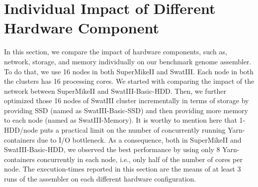 \documentclass[conference]{IEEEtran}
\begin{document}
\section {Individual Impact of Different Hardware Component} \label{IndividualImpactofDifferentHardwareConfiguration}
In this section, we compare the impact of hardware components, such as, network, storage, and memory individually on our benchmark genome assembler. To do that, we use 16 nodes in both SuperMikeII and SwatIII. Each node in both the clusters has 16 processing cores. We started with comparing the impact of the network between SuperMikeII and SwatIII-Basic-HDD. Then, we further optimized those 16 nodes of SwatIII cluster incrementally in terms of storage by providing SSD (named as SwatIII-Basic-SSD) and then providing more memory to each node (named as SwatIII-Memory). It is worthy to mention here that 1-HDD/node puts a practical limit on the number of concurrently running Yarn-containers due to I/O bottleneck. As a consequence, both in SuperMikeII and SwatIII-Basic-HDD, we observed the best performance by using only 8 Yarn-containers concurrently in each node, i.e., only half of the number of cores per node. The execution-times reported in this section are the means of at least 3 runs of the assembler on each different hardware configuration.
\label{IndividualHWEffect}
\end{document}
